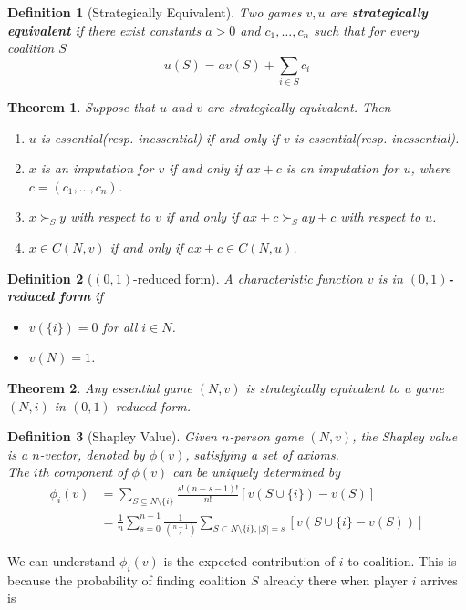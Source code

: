 \documentclass[12pt]{article}
\newtheorem{definition}{Definition}[section]
\newtheorem{theorem}{Theorem}[section]
\theoremstyle{definition}
\begin{document}
\begin{definition}[Strategically Equivalent]
\normalfont Two games $v, u$ are \textbf{strategically equivalent} if there exist constants $a>0$ and $c_1,\ldots, c_n$ such that for every coalition $S$
\[
u(S)=av(S)+\sum_{i\in S}c_i
\]
\end{definition}
\begin{theorem}\normalfont Suppose that $u$ and $v$ are strategically equivalent. Then
\begin{enumerate}
  \item $u$ is essential(resp. inessential) \textit{if and only if} $v$ is essential(resp. inessential).
  \item $x$ is an imputation for $v$ \textit{if and only if} $ax+c$ is an imputation for $u$, where $c=(c_1,\ldots, c_n)$.
  \item $x\succ_S y$ with respect to $v$ \textit{if and only if} $ax+c\succ_S ay+c$ with respect to $u$.
  \item $x\in C(N, v)$ \textit{if and only if} $ax+c\in C(N, u)$.
\end{enumerate} 
\end{theorem}
\begin{definition}[{$(0,1)$}-reduced form]
\normalfont A characteristic function $v$ is in $(0,1)$\textbf{-reduced form} if
\begin{itemize}
\item $v(\{i\})=0$ for all $i\in N$.
\item $v(N)=1$.
\end{itemize} 
\end{definition}
\begin{theorem}\normalfont Any essential game $(N, v)$ is strategically equivalent to a game $(N, i)$ in $(0,1)$-reduced form.
\end{theorem}
\begin{definition}[Shapley Value]
\normalfont Given $n$-person game $(N, v)$, the Shapley value is a $n$-vector, denoted by $\phi(v)$, satisfying a set of axioms. \\
The $i$th component of $\phi(v)$ can be uniquely determined by
\begin{align*}
\phi_i(v)&=\sum_{S\subseteq N\setminus\{i\}}\frac{s!(n-s-1)!}{n!}[v(S\cup \{i\})-v(S)]\\
&=\frac{1}{n}\sum_{s=0}^{n-1}\frac{1}{\binom{n-1}{s}}\sum_{S\subset N\setminus\{i\}, |S|=s}[v(S\cup\{i\}-v(S))]
\end{align*}
\end{definition}
We can understand $\phi_i(v)$ is the expected contribution of $i$ to coalition. This is because the probability of finding coalition $S$ already there when player $i$ arrives is
\end{document}

